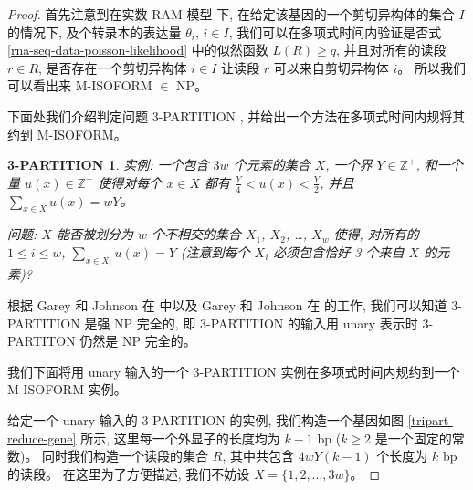 \begin{proof}

首先注意到在实数 RAM 模型 \cite{Preparata:1985:CGI:4333} 下, 
在给定该基因的一个剪切异构体的集合 $I$ 的情况下, 及个转录本的表达量 $\theta_i$, $i\in I$, 
我们可以在多项式时间内验证是否式 \eqref{rna-seq-data-poisson-likelihood} 中的似然函数 $L(R) \geq q$, 
并且对所有的读段 $r\in R$, 
是否存在一个剪切异构体 $i\in I$ 让读段 $r$ 可以来自剪切异构体 $i$。 
所以我们可以看出来 M-ISOFORM $\in$ NP。 

下面处我们介绍判定问题 3-PARTITION \cite{doi:10.1137/0204035, Garey:1990:CIG:574848}, 
并给出一个方法在多项式时间内规将其约到 M-ISOFORM。 

\newtheorem*{tripart}{3-PARTITION}

\begin{tripart}
\hspace*{1mm}

实例: 一个包含 $3w$ 个元素的集合 $X$, 一个界 $Y \in \mathbb{Z}^+$, 
和一个量 $u(x) \in \mathbb{Z}^+$ 使得对每个 $x \in X$ 
都有 $\frac{Y}{4} < u(x) < \frac{Y}{2}$, 
并且 $\sum_{x \in X} u(x) = w Y$。

问题: $X$ 能否被划分为 $w$ 个不相交的集合 $X_1$, $X_2$, \ldots, $X_w$ 使得, 
对所有的 $1 \leq i \leq w$, $\sum_{x \in X_i} u(x) = Y$ 
(注意到每个 $X_i$ 必须包含恰好 3 个来自 $X$ 的元素)?
\end{tripart}

根据 Garey 和 Johnson 在  中以及 
Garey 和 Johnson 在  的工作, 
我们可以知道 3-PARTITION 是强 NP 完全的, 
即 3-PARTITION 的输入用 unary 表示时 3-PARTITON 仍然是 NP 完全的。 

我们下面将用 unary 输入的一个 3-PARTITION 实例在多项式时间内规约到一个 M-ISOFORM 实例。 

给定一个 unary 输入的 3-PARTITION 的实例, 
我们构造一个基因如图 \ref{tripart-reduce-gene} 所示, 
这里每一个外显子的长度均为 $k-1$ bp ($k\geq 2$ 是一个固定的常数)。 
同时我们构造一个读段的集合 $R$, 
其中共包含 $4wY(k-1)$ 个长度为 $k$ bp 的读段。 
在这里为了方便描述, 我们不妨设 $X=\{1,2,\ldots,3w\}$。 


\end{proof}
